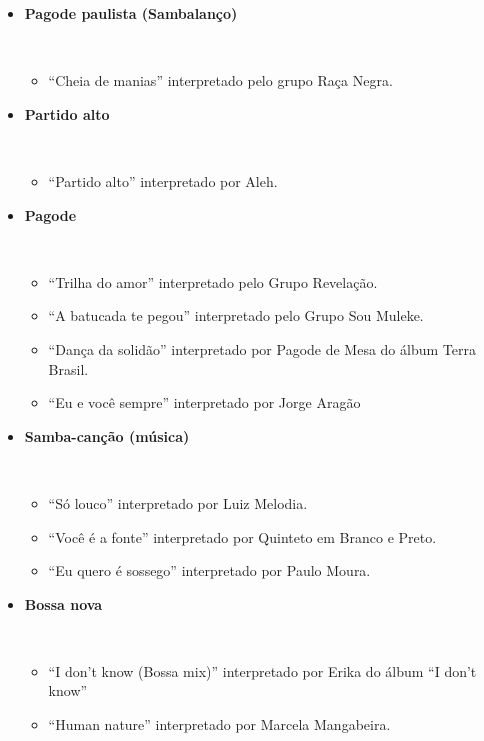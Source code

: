 \begin{itemize}
\item \textbf{Pagode paulista (Sambalanço)}
\begin{example} ~
\begin{itemize}
\item ``Cheia de manias''  interpretado pelo grupo Raça Negra.
\end{itemize}
\end{example} 

\item \textbf{Partido alto}
\begin{example} ~
\begin{itemize}
\item ``Partido alto'' interpretado por Aleh.
\end{itemize}
\end{example} 

\item \textbf{Pagode}
\begin{example} ~
\begin{itemize}
\item ``Trilha do amor''  interpretado pelo Grupo Revelação. 
\item ``A batucada te pegou'' interpretado pelo Grupo Sou Muleke.
\item ``Dança da solidão'' interpretado por Pagode de Mesa do álbum Terra Brasil. 
\item ``Eu e você sempre'' interpretado por Jorge Aragão
\end{itemize}
\end{example} 

\item \textbf{Samba-canção (música)}
\begin{example} ~
\begin{itemize}
\item ``Só louco'' interpretado por Luiz Melodia.
\item ``Você é a fonte'' interpretado por  Quinteto em Branco e Preto.
\item ``Eu quero é sossego'' interpretado por Paulo Moura.
\end{itemize}
\end{example} 

\item \textbf{Bossa nova}
\begin{example} ~
\begin{itemize}
\item ``I don't know (Bossa mix)'' interpretado por Erika do álbum ``I don't know''
\item ``Human nature'' interpretado por Marcela Mangabeira.
\end{itemize}
\end{example} 



\end{itemize}
